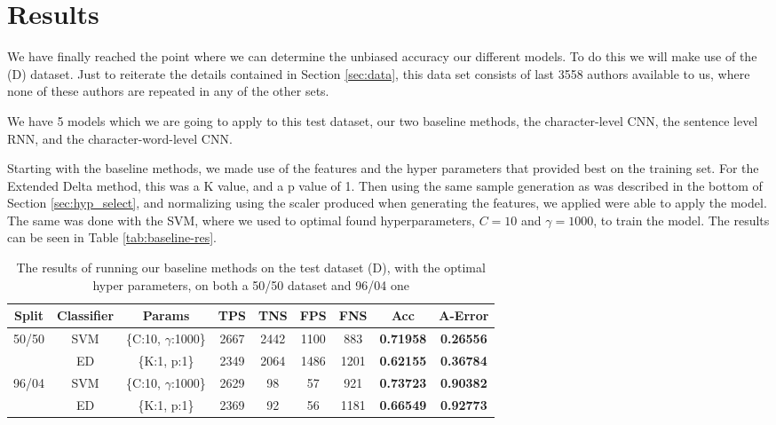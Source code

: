 \section{Results} \label{sec:results}

We have finally reached the point where we can determine the unbiased accuracy
our different models. To do this we will make use of the (D) dataset. Just
to reiterate the details contained in Section \ref{sec:data}, this data set
consists of last 3558 authors available to us, where none of these authors are
repeated in any of the other sets.

We have 5 models which we are going to apply to this test dataset,
our two baseline methods, the character-level \gls{CNN}, the sentence
level RNN, and the character-word-level \gls{CNN}.

Starting with the baseline methods, we made use of the features and the
hyper parameters that provided best on the training set.
For the Extended Delta method, this was a K value, and a p value of 1.
Then using the same sample generation as was described in the bottom
of Section \ref{sec:hyp_select}, and normalizing using the scaler
produced when generating the features, we applied were able to apply the model.
The same was done with the SVM, where we used to optimal found hyperparameters,
$C=10$ and $\gamma = 1000$, to train the model. The results can be seen in Table
\ref{tab:baseline-res}.

\begin{table}[h]
\centering
\begin{tabular}{|c|c|c|c|c|c|c||c|c|}
\hline
Split & Classifier & Params & TPS & TNS & FPS & FNS & \textbf{Acc} & \textbf{A-Error} \\ \hline
\multirow{2}{*}{50/50} & SVM & \{C:10, $\gamma$:1000\} & 2667 & 2442 & 1100 & 883 & \textbf{0.71958} & \textbf{0.26556} \\ \cline{2-9} 
 & ED & \{K:1, p:1\} & 2349 & 2064 & 1486 & 1201 & \textbf{0.62155} & \textbf{0.36784} \\ \hline
\multirow{2}{*}{96/04} & SVM & \{C:10, $\gamma$:1000\} & 2629 & 98 & 57 & 921 & \textbf{0.73723} & \textbf{0.90382} \\ \cline{2-9} 
 & ED & \{K:1, p:1\} & 2369 & 92 & 56 & 1181 & \textbf{0.66549} & \textbf{0.92773} \\ \hline
\end{tabular}
\caption{The results of running our baseline methods on the test dataset (D), with the optimal hyper
parameters, on both a 50/50 dataset and 96/04 one}
\label{tag:baseline-res}
\end{table}

